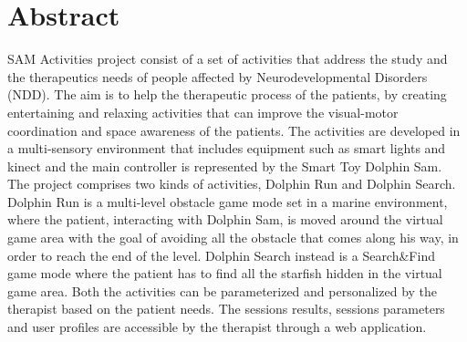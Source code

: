 \chapter{Abstract}
SAM Activities project consist of a set of activities that address the study and the therapeutics needs of people affected by Neurodevelopmental Disorders (NDD).
The aim is to help the therapeutic process of the patients, by creating entertaining and relaxing activities that can improve the visual-motor coordination and space awareness of the patients. 
The activities are developed in a multi-sensory environment that includes equipment such as smart lights and kinect and the main controller is represented by the Smart Toy Dolphin Sam. \newline
The project comprises two kinds of activities, Dolphin Run and Dolphin Search. Dolphin Run is a multi-level obstacle game mode set in a marine environment, where the patient, interacting with Dolphin Sam, is moved around the virtual game area with the goal of avoiding all the obstacle that comes along his way, in order to reach the end of the level. Dolphin Search instead is a Search\&Find game mode where the patient has to find all the starfish hidden in the virtual game area.
Both the activities can be parameterized and personalized by the therapist based on the patient needs. The sessions results, sessions parameters and user profiles are accessible by the therapist through a web application.
